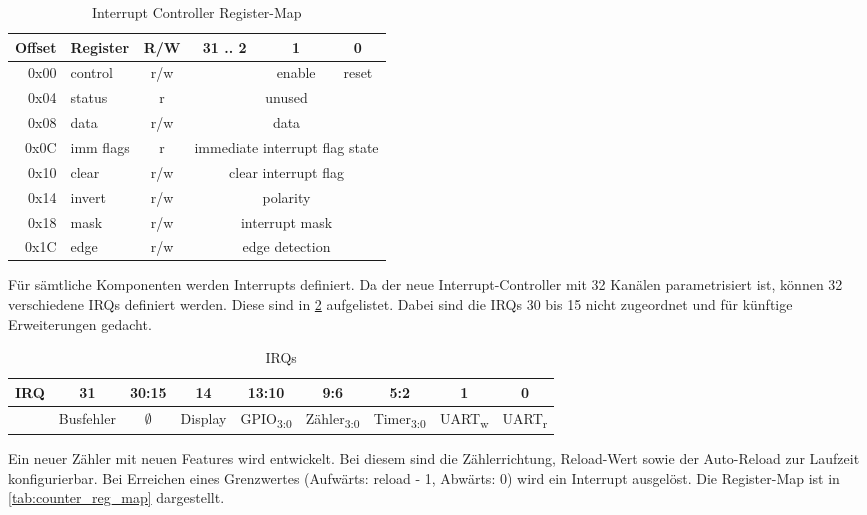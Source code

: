 \begin{table}[!htbp]
	\bigskip
	\centering
	\begin{tabular}{ | r | l | c | c | c | c |}
		\hline
		\textbf{Offset} & \textbf{Register} & \textbf{R/W} & \textbf{31 .. 2} & \textbf{1} & \textbf{0} \\
		\hline
		0x00 & control & r/w & & enable & reset \\
		\hline
		0x04 & status &  r &  \multicolumn{3}{c|}{unused} \\
		\hline
		0x08 & data & r/w & \multicolumn{3}{c|}{data} \\
		\hline
		0x0C & imm flags &  r & \multicolumn{3}{c|}{immediate interrupt flag state} \\	
		\hline
		0x10 & clear & r/w & \multicolumn{3}{c|}{clear interrupt flag} \\
		\hline
	    0x14 & invert & r/w &  \multicolumn{3}{c|}{polarity}\\
	    \hline
		0x18 & mask & r/w & \multicolumn{3}{c|}{interrupt mask} \\
		\hline
		0x1C & edge & r/w &  \multicolumn{3}{c|}{edge detection} \\
		\hline
	\end{tabular}
	
	\caption{Interrupt Controller Register-Map}
	\label{tab:ir_contrroller_reg_map}
\end{table}

Für sämtliche Komponenten werden Interrupts definiert. Da der neue Interrupt-Controller mit 32 Kanälen parametrisiert ist, können 32 verschiedene \glspl{IRQ} definiert werden. Diese sind in \cref{tab:interrupts} aufgelistet. Dabei sind die \glspl{IRQ} 30 bis 15 nicht zugeordnet und für künftige Erweiterungen gedacht.

\begin{table}[!htbp]
	\bigskip
	\centering
	\begin{tabular}{ l | c | c | c | c | c | c | c | c }
		\textbf{\gls{IRQ}} & 31 & 30:15 & 14 & 13:10 & 9:6 & 5:2 & 1 & 0 \\
		\hline
		& Busfehler & $\emptyset$ & Display & GPIO\textsubscript{3:0} & Zähler\textsubscript{3:0} & Timer\textsubscript{3:0} & UART\textsubscript{w} & UART\textsubscript{r} \\
		\hline
	\end{tabular}
	
	\caption{\glspl{IRQ}}
	\label{tab:interrupts}
\end{table}

Ein neuer Zähler mit neuen Features wird entwickelt. Bei diesem sind die Zählerrichtung, Reload-Wert sowie der Auto-Reload zur Laufzeit konfigurierbar. Bei Erreichen eines Grenzwertes (Aufwärts: reload - 1, Abwärts: 0) wird ein Interrupt ausgelöst. Die Register-Map ist in \cref{tab:counter_reg_map} dargestellt.

